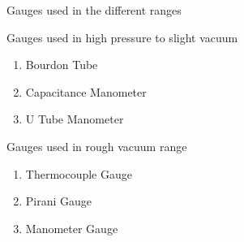 \documentclass[11pt]{beamer}
\begin{document}
\begin{frame}{Gauges used in the different ranges}

\begin{exampleblock}{Gauges used in high pressure to slight vacuum}

	\begin{enumerate}
	
	
		\item Bourdon Tube
		\item Capacitance Manometer
		\item U Tube Manometer
		 
		
	\end{enumerate}

\end{exampleblock}

\begin{exampleblock}{Gauges used in rough vacuum range}

	\begin{enumerate}
	
		\item  Thermocouple Gauge
		\item  Pirani Gauge
		\item  Manometer Gauge
		
	\end{enumerate}

\end{exampleblock}




\end{frame}
\end{document}
